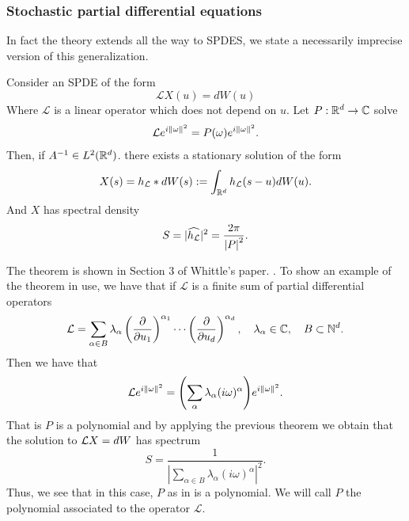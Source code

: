 \documentclass[
    a4paper,
    DIV=14,
    abstract=true,
    numbers=noenddot
]{scrartcl}
\begin{document}
\subsubsection{Stochastic partial differential equations}
In fact the theory extends all the way to SPDES, we state a necessarily imprecise version of this generalization.
\begin{theorem}\label{spde theorem}
	Consider an  SPDE of the form
	\begin{equation}\label{spde}
		\mathcal{L}X(u)=dW(u)
	\end{equation}
	Where $\mathcal{L}$ is a linear operator which does not depend on $u$. Let $P:\mathbb{R}^d\to\mathbb{C}$  solve
	\begin{equation*}
		\mathcal{L}e^{i\left\lVert \omega \right\rVert^2}=P(\omega)e^{i\left\lVert \omega \right\rVert^2}.
	\end{equation*}
	Then, if $A^{-1}\in L^2(\mathbb{R}^d)$. there exists a stationary solution of the form
	\begin{equation*}
		X(s)=h_{\mathcal{L}}*dW(s):=\int_{\mathbb{R}^d} h_{\mathcal{L}}(s-u)dW(u).
	\end{equation*}
	And $X$ has spectral density
	\begin{equation*}
		S={|\widehat{h_\mathcal{L}}|^2}=\frac{2\pi}{\left| P \right|^2}.
	\end{equation*}
\end{theorem}
The theorem is shown in Section $3$ of Whittle's paper. \cite{whittle1963stochastic}. To show an example of the theorem in use, we have that if $\mathcal{L}$ is a finite sum of partial differential operators
\begin{equation*}
	\mathcal{L}=\sum_{\alpha\in B} \lambda_\alpha\left(\frac{\partial}{\partial u_1}\right)^{\alpha_1}\cdots \left(\frac{\partial}{\partial u_d}\right)^{\alpha_d},\quad \lambda_{\alpha}\in\mathbb{C},\quad B\subset\mathbb{N}^d.
\end{equation*}
Then we have that
\begin{equation*}
	\mathcal{L}e^{i\left\lVert \omega \right\rVert^2}=\qty(\sum_\alpha \lambda_\alpha(i\omega)^\alpha)e^{i\left\lVert \omega \right\rVert^2}.
\end{equation*}
That is $P$ is a polynomial and by applying the previous theorem we obtain that the solution to $\mathcal{L} X=dW$ has spectrum
\begin{equation*}
	S=\frac{1}{|\sum_{\alpha\in B}\lambda_\alpha(i\omega)^\alpha|^2}.
\end{equation*}
Thus, we see that in this case, $P$ as in  is a polynomial. We will call $P$ the polynomial associated to the operator $\mathcal{L}$.
\end{document}
